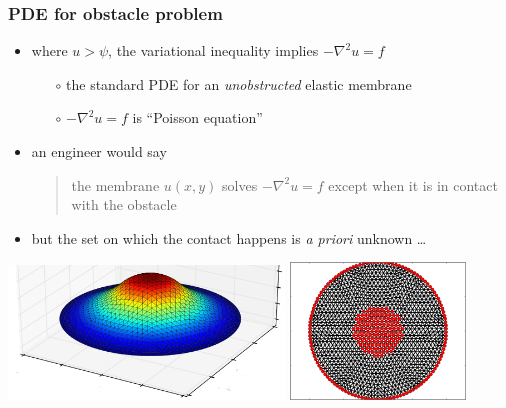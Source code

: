 \documentclass{beamer}
\newcommand{\grad}{\nabla}
\begin{document}
\begin{frame}
  \frametitle{PDE for obstacle problem}

\small
\begin{itemize}
\item where $u>\psi$, the variational inequality implies $-\grad^2 u = f$
   \begin{itemize}
   \item[$\circ$] the standard PDE for an \emph{unobstructed} elastic membrane
   \item[$\circ$] $-\grad^2 u = f$ is ``Poisson equation''
   \end{itemize}
\item an engineer would say
\begin{quote}
the membrane $u(x,y)$ solves $-\grad^2 u = f$ except when it is in contact with the obstacle
\end{quote}
\item but the set on which the contact happens is \emph{a priori} unknown \dots
\end{itemize}
\normalsize

\begin{center}
\includegraphics[width=0.55\textwidth]{figs/obs-soln} \quad \includegraphics[width=0.35\textwidth]{figs/obs-coincidence} 
\end{center}
\end{frame}
\end{document}
